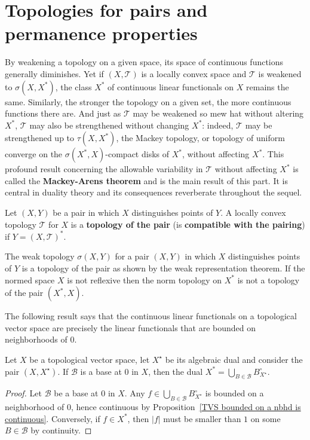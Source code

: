 \section{Topologies for pairs and permanence properties}
By weakening a topology on a given space, its space of continuous functions generally diminishes. Yet if $(X,\mathcal{T})$ is a locally convex space and $\mathcal{T}$ is weakened to $\sigma(X,X^*)$, the class $X^*$ of continuous linear functionals on $X$ remains the same. Similarly, the stronger the topology on a given set, the more continuous functions there are. And just as $\mathcal{T}$ may be weakened so mew hat without altering $X^*$, $\mathcal{T}$ may also be strengthened without changing $X^*$: indeed, $\mathcal{T}$ may be strengthened up to $\tau(X,X^*)$, the Mackey topology, or topology of uniform converge on the $\sigma(X^*,X)$-compact disks of $X^*$, without affecting $X^*$. This profound result concerning the allowable variability in $\mathcal{T}$ without affecting $X^*$ is called the \textbf{Mackey-Arens theorem} and is the main result of this part. It is central in duality theory and its consequences reverberate throughout the sequel.
\begin{definition}
Let $(X,Y)$ be a pair in which $X$ distinguishes points of $Y$. A locally convex topology $\mathcal{T}$ for $X$ is a \textbf{topology of the pair} (is \textbf{compatible with the pairing}) if $Y=(X,\mathcal{T})^*$.
\end{definition}
The weak topology $\sigma(X,Y)$ for a pair $(X,Y)$ in which $X$ distinguishes points of $Y$ is a topology of the pair as shown by the weak representation theorem. If the normed space $X$ is not reflexive then the norm topology on $X^*$ is not a topology of the pair $(X^*,X)$.\par
The following result says that the continuous linear functionals on a topological vector space are precisely the linear functionals that are bounded on neighborhoods of $0$.
\begin{proposition}\label{TVS dual char}
Let $X$ be a topological vector space, let $X^{\star}$ be its algebraic dual and consider the pair $(X,X^{\star})$. If $\mathcal{B}$ is a base at $0$ in $X$, then the dual $X^*=\bigcup_{B\in\mathcal{B}}B^\circ_{X^{\star}}$.
\end{proposition}
\begin{proof}
Let $\mathcal{B}$ be a base at $0$ in $X$. Any $f\in\bigcup_{B\in\mathcal{B}}B^\circ_{X^{\star}}$ is bounded on a neighborhood of $0$, hence continuous by Proposition~\ref{TVS bounded on a nbhd is continuous}. Conversely, if $f\in X^*$, then $|f|$ must be smaller than $1$ on some $B\in\mathcal{B}$ by continuity.
\end{proof}
